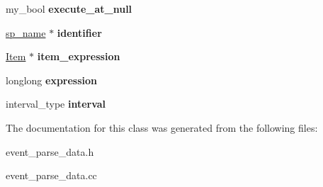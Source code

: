 \begin{DoxyCompactItemize}
my\+\_\+bool {\bfseries execute\+\_\+at\+\_\+null}
\item 
\mbox{\label{classEvent__parse__data_a628df5f44f12a4bf4534a0eb4ee3c883}} 
\mbox{\hyperlink{classsp__name}{sp\+\_\+name}} $\ast$ {\bfseries identifier}
\item 
\mbox{\label{classEvent__parse__data_ae33ab318cd8edae7885420bacd9b3891}} 
\mbox{\hyperlink{classItem}{Item}} $\ast$ {\bfseries item\+\_\+expression}
\item 
\mbox{\label{classEvent__parse__data_a2d4f335c75211575be255aeabc2a2d66}} 
longlong {\bfseries expression}
\item 
\mbox{\label{classEvent__parse__data_a3089527ca42c65667ddd1b5b52372969}} 
interval\+\_\+type {\bfseries interval}
\end{DoxyCompactItemize}


The documentation for this class was generated from the following files\+:\begin{DoxyCompactItemize}
\item 
event\+\_\+parse\+\_\+data.\+h\item 
event\+\_\+parse\+\_\+data.\+cc\end{DoxyCompactItemize}
